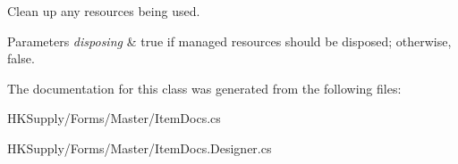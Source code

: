 Clean up any resources being used. 


\begin{DoxyParams}{Parameters}
{\em disposing} & true if managed resources should be disposed; otherwise, false.\\
\hline
\end{DoxyParams}


The documentation for this class was generated from the following files\+:\begin{DoxyCompactItemize}
\item 
H\+K\+Supply/\+Forms/\+Master/Item\+Docs.\+cs\item 
H\+K\+Supply/\+Forms/\+Master/Item\+Docs.\+Designer.\+cs\end{DoxyCompactItemize}
